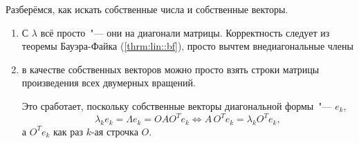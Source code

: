 \documentclass{trlnotes}
\begin{document}
Разберёмся, как искать собственные числа и собственные векторы.
\begin{enumerate}
  \item С $λ$ всё просто~"---  они на диагонали матрицы. Корректность следует
    из теоремы Бауэра-Файка (\ref{thrm:lin::bf}), просто вычтем внедиагональные
    члены
  \item в качестве собственных векторов можно просто взять строки матрицы
    произведения всех двумерных вращений.
    
    Это сработает, поскольку собственные векторы диагональной
    формы~"--- $e_k$,
    \[
      λ_k e_k = Λ e_k = OA O^{T} e_k \iff A\,O^{T}e_k = λ_k O^{T}e_k,
    \]
    а $O^Te_k$ как раз $k$-ая строчка $O$.
\end{enumerate}
\end{document}
